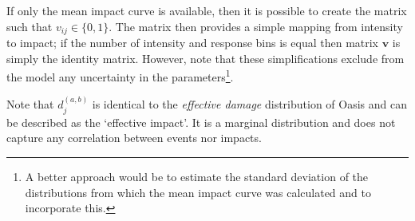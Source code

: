 \documentclass[a4paper,11pt]{extarticle} %
\begin{document}
If only the mean impact curve is available, then it is possible to create the matrix such that $v_{ij} \in \{0, 1\}$. The matrix then provides a simple mapping from intensity to impact; if the number of intensity and response bins is equal then matrix $\mathbf{v}$ is simply the identity matrix. However, note that these simplifications exclude from the model any uncertainty in the parameters\footnote{A better approach would be to estimate the standard deviation of the distributions from which the mean impact curve was calculated and to incorporate this.}.

Note that $d^{(a,b)}_j$ is identical to the {\it effective damage} distribution of Oasis and can be described as the `effective impact'. It is a marginal distribution and does not capture any correlation between events nor impacts.
\end{document}
